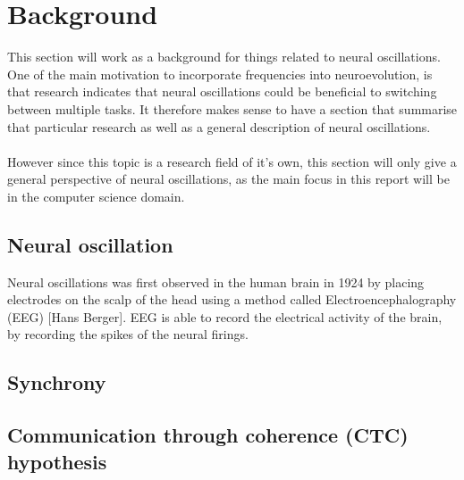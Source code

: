 \documentclass[11pt, a4paper]{article}
\begin{document}
\author{Mads Anthony}
\section{Background}
This section will work as a background for things related to neural oscillations. One of the main motivation to incorporate frequencies into neuroevolution, is that research indicates that neural oscillations could be beneficial to switching between multiple tasks. It therefore makes sense to have a section that summarise that particular research as well as a general description of neural oscillations.
\\
\\
However since this topic is a research field of it's own, this section will only give a general perspective of neural oscillations, as the main focus in this report will be in the computer science domain.
\subsection{Neural oscillation}
Neural oscillations was first observed in the human brain in 1924 by placing electrodes on the scalp of the head using a method called Electroencephalography (EEG) [Hans Berger]. EEG is able to record the electrical activity of the brain, by recording the spikes of the neural firings.
\subsection{Synchrony}
\subsection{Communication through coherence (CTC) hypothesis}
\newpage
\end{document}

